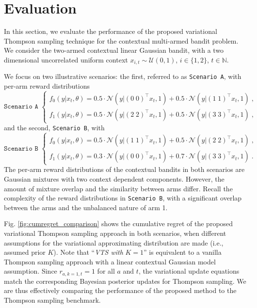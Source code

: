 \documentclass{article}
\def \Natural{{\mathbb N}}
\newcommand{\ie}{i.e., }
\newcommand{\N}{\mathcal{N}}
\newcommand{\U}{\mathcal{U}}
\begin{document}
\section{Evaluation}
\label{sec:evaluation}

In this section, we evaluate the performance of the proposed variational Thompson sampling technique for the contextual multi-armed bandit problem. We consider the two-armed contextual linear Gaussian bandit, with a two dimensional uncorrelated uniform context $x_{i,t}\sim\U(0,1)$, $i\in\{1,2\}$, $t\in \Natural$.

We focus on two illustrative scenarios: the first, referred to as \texttt{Scenario A}, with per-arm reward distributions
\begin{equation}
\texttt{Scenario A }\begin{cases}
f_{0}(y|x_t,\theta) = 0.5 \cdot \N\left(y|(0 \; 0)^\top x_t , 1\right) + 0.5 \cdot \N\left(y|(1 \; 1)^\top x_t , 1\right) \; ,\\
f_{1}(y|x_t,\theta) = 0.5 \cdot \N\left(y|(2 \; 2)^\top x_t , 1\right) + 0.5 \cdot \N\left(y|(3 \; 3)^\top x_t , 1\right) \; ,
\end{cases}
\label{eq:scenario_A}
\end{equation}
and the second, \texttt{Scenario B}, with
\begin{equation}
\texttt{Scenario B }\begin{cases}
f_{0}(y|x_t,\theta) = 0.5 \cdot \N\left(y|(1 \; 1)^\top x_t , 1\right) + 0.5 \cdot \N\left(y|(2 \; 2)^\top x_t , 1\right) \; ,\\
f_{1}(y|x_t,\theta) = 0.3 \cdot \N\left(y|(0 \; 0)^\top x_t , 1\right) + 0.7 \cdot \N\left(y|(3 \; 3)^\top x_t , 1\right) \; .
\end{cases}
\label{eq:scenario_B}
\end{equation}
The per-arm reward distributions of the contextual bandits in both scenarios are Gaussian mixtures with two context dependent components. However, the amount of mixture overlap and the similarity between arms differ. Recall the complexity of the reward distributions in \texttt{Scenario B}, with a significant overlap between the arms and the unbalanced nature of arm 1.

Fig. \ref{fig:cumregret_comparison} shows the cumulative regret of the proposed variational Thompson sampling approach in both scenarios, when different assumptions for the variational approximating distribution are made (\ie assumed prior $K$). Note that ``\textit{VTS with }$K=1$'' is equivalent to a vanilla Thompson sampling approach with a linear contextual Gaussian model assumption. Since $r_{a,k=1,t}=1$ for all $a$ and $t$, the variational update equations match the corresponding Bayesian posterior updates for Thompson sampling. We are thus effectively comparing the performance of the proposed method to the Thompson sampling benchmark.
\end{document}

